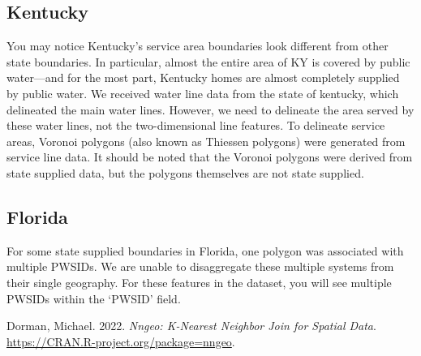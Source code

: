 \documentclass[
  letterpaper,
  DIV=11,
  numbers=noendperiod,
  oneside]{scrartcl}
\newlength{\cslhangindent}
\newenvironment{CSLReferences}[2] %
 {\begin{list}{}{%
  \setlength{\itemindent}{0pt}
  \setlength{\leftmargin}{0pt}
  \setlength{\parsep}{0pt}
  \ifodd #1
   \setlength{\leftmargin}{\cslhangindent}
   \setlength{\itemindent}{-1\cslhangindent}
  \fi
  \setlength{\itemsep}{#2\baselineskip}}}
 {\end{list}}
\begin{document}
\subsection{Kentucky}\label{kentucky}

You may notice Kentucky's service area boundaries look different from
other state boundaries. In particular, almost the entire area of KY is
covered by public water---and for the most part, Kentucky homes are
almost completely supplied by public water. We received water line data
from the state of kentucky, which delineated the main water lines.
However, we need to delineate the area served by these water lines, not
the two-dimensional line features. To delineate service areas, Voronoi
polygons (also known as Thiessen polygons) were generated from service
line data. It should be noted that the Voronoi polygons were derived
from state supplied data, but the polygons themselves are not state
supplied.

\subsection{Florida}\label{florida}

For some state supplied boundaries in Florida, one polygon was
associated with multiple PWSIDs. We are unable to disaggregate these
multiple systems from their single geography. For these features in the
dataset, you will see multiple PWSIDs within the `PWSID' field.

\label{refs}
\begin{CSLReferences}{1}{0}
Dorman, Michael. 2022. \emph{Nngeo: K-Nearest Neighbor Join for Spatial
Data}. \url{https://CRAN.R-project.org/package=nngeo}.

\end{CSLReferences}
\end{document}
